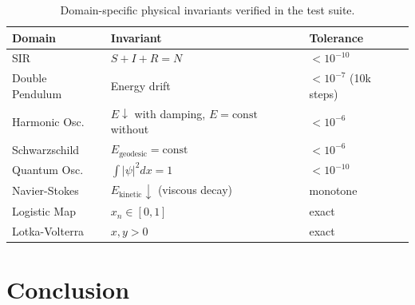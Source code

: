 \documentclass{article}
\begin{document}
\begin{table}[h]
\centering
\caption{Domain-specific physical invariants verified in the test suite.}
\label{tab:validation}
\small
\begin{tabular}{lll}
\toprule
Domain & Invariant & Tolerance \\
\midrule
SIR & $S + I + R = N$ & $< 10^{-10}$ \\
Double Pendulum & Energy drift & $< 10^{-7}$ (10k steps) \\
Harmonic Osc. & $E \downarrow$ with damping, $E = \text{const}$ without & $< 10^{-6}$ \\
Schwarzschild & $E_{\text{geodesic}} = \text{const}$ & $< 10^{-6}$ \\
Quantum Osc. & $\int |\psi|^2 dx = 1$ & $< 10^{-10}$ \\
Navier-Stokes & $E_{\text{kinetic}} \downarrow$ (viscous decay) & monotone \\
Logistic Map & $x_n \in [0, 1]$ & exact \\
Lotka-Volterra & $x, y > 0$ & exact \\
\bottomrule
\end{tabular}
\end{table}

\section{Conclusion}
\label{sec:conclusion}
\end{document}

